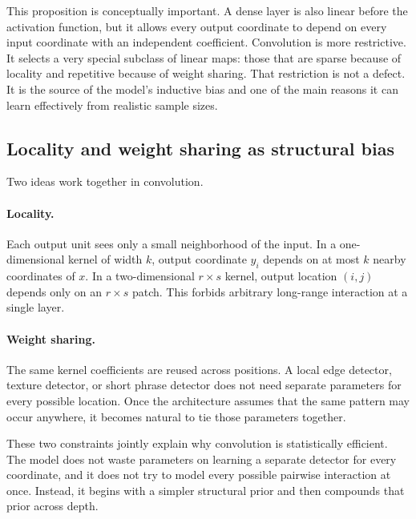 \medskip

This proposition is conceptually important.
A dense layer is also linear before the activation function, but it allows every output coordinate to depend on every input coordinate with an independent coefficient.
Convolution is more restrictive.
It selects a very special subclass of linear maps: those that are sparse because of locality and repetitive because of weight sharing.
That restriction is not a defect.
It is the source of the model's inductive bias and one of the main reasons it can learn effectively from realistic sample sizes.

\subsection*{Locality and weight sharing as structural bias}

Two ideas work together in convolution.

\paragraph{Locality.}
Each output unit sees only a small neighborhood of the input.
In a one-dimensional kernel of width $k$, output coordinate $y_i$ depends on at most $k$ nearby coordinates of $x$.
In a two-dimensional $r \times s$ kernel, output location $(i,j)$ depends only on an $r \times s$ patch.
This forbids arbitrary long-range interaction at a single layer.

\paragraph{Weight sharing.}
The same kernel coefficients are reused across positions.
A local edge detector, texture detector, or short phrase detector does not need separate parameters for every possible location.
Once the architecture assumes that the same pattern may occur anywhere, it becomes natural to tie those parameters together.

\medskip

These two constraints jointly explain why convolution is statistically efficient.
The model does not waste parameters on learning a separate detector for every coordinate, and it does not try to model every possible pairwise interaction at once.
Instead, it begins with a simpler structural prior and then compounds that prior across depth.

